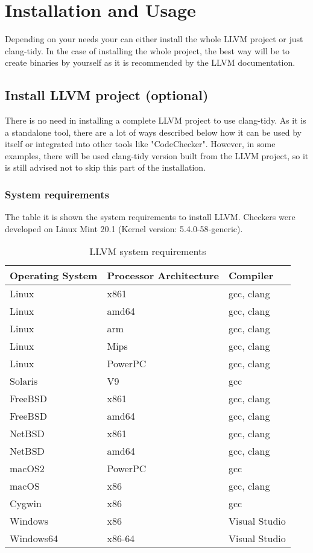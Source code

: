 \section{Installation and Usage}

Depending on your needs your can either install the whole LLVM project or just clang-tidy. In the case of installing the whole project, the best way will be to create binaries by yourself as it is recommended by the LLVM documentation. 

\subsection{Install LLVM project (optional)}

There is no need in installing a complete LLVM project to use clang-tidy. As it is a standalone tool, there are a lot of ways described below how it can be used by itself or integrated into other tools like "CodeChecker". However, in some examples, there will be used clang-tidy version built from the LLVM project, so it is still advised not to skip this part of the installation. 

\subsubsection{System requirements}

The table it is shown the system requirements to install LLVM. Checkers were developed on Linux Mint 20.1 (Kernel version: 5.4.0-58-generic).

\begin{table}[H]
	\centering
	\begin{tabular}{ | m{} | m{} | m{} |}
            \hline
		\textbf{Operating System} & \textbf{Processor Architecture} & \textbf{Compiler}   \\ 
		  \hline
		Linux & x861 & gcc, clang\\
		\hline
		Linux & amd64 & gcc, clang\\
		\hline
		Linux & arm & gcc, clang\\
		\hline
		Linux & Mips & gcc, clang\\
		\hline
		Linux & PowerPC & gcc, clang\\
		\hline
		Solaris & V9 & gcc\\
		\hline
		FreeBSD & x861 & gcc, clang\\
		\hline
		FreeBSD & amd64 & gcc, clang\\
		\hline
		NetBSD & x861 & gcc, clang\\
		\hline
		NetBSD & amd64 & gcc, clang\\
		\hline
		macOS2 & PowerPC & gcc\\
		\hline
		macOS & x86 & gcc, clang\\
		\hline
		Cygwin & x86 & gcc\\
		\hline
		Windows & x86 & Visual Studio\\
		\hline
		Windows64 & x86-64 & Visual Studio\\
		\hline
	\end{tabular}
	\caption{LLVM system requirements}
	\label{tab:sys-req}
\end{table}


